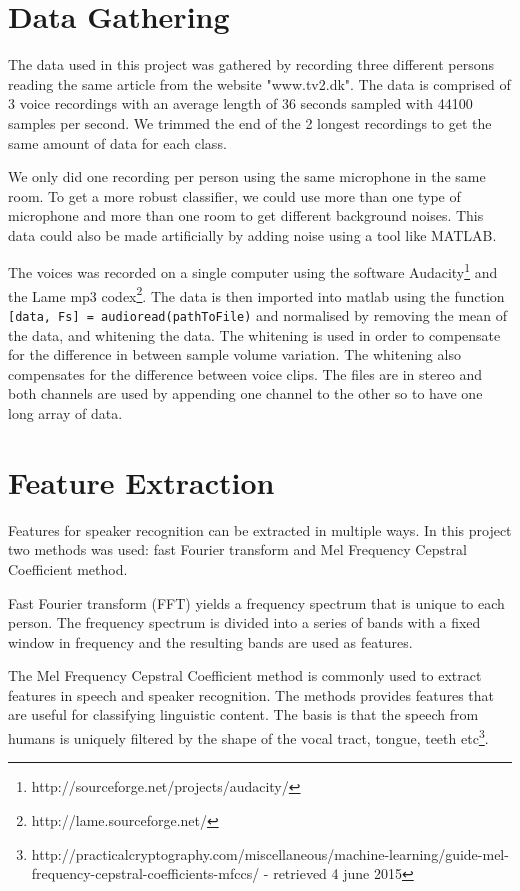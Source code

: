 
\section{Data Gathering}
The data used in this project was gathered by recording three different persons reading the same article from the website "www.tv2.dk".
The data is comprised of 3 voice recordings with an average length of 36 seconds sampled with 44100 samples per second.
We trimmed the end of the 2 longest recordings to get the same amount of data for each class.

We only did one recording per person using the same microphone in the same room.
To get a more robust classifier, we could use more than one type of microphone and more than one room to get different background noises.
This data could also be made artificially by adding noise using a tool like MATLAB.

The voices was recorded on a single computer using the software Audacity\footnote{http://sourceforge.net/projects/audacity/} and the Lame mp3 codex\footnote{http://lame.sourceforge.net/}.
The data is then imported into matlab using the function \texttt{[data, Fs] = audioread(pathToFile)} and normalised by removing the mean of the data, and whitening the data.
The whitening is used in order to compensate for the difference in between sample volume variation. The whitening also compensates for the difference between voice clips.
The files are in stereo and both channels are used by appending one channel to the other so to have one long array of data.

\section{Feature Extraction}
Features for speaker recognition can be extracted in multiple ways. In this project two methods was used: fast Fourier transform and Mel Frequency Cepstral Coefficient method.

Fast Fourier transform (FFT) yields a frequency spectrum that is unique to each person. The frequency spectrum is divided into a series of bands with a fixed window in frequency and the resulting bands are used as features. 

The Mel Frequency Cepstral Coefficient method is commonly used to extract features in speech and speaker recognition. The methods provides features that are useful for classifying linguistic content. The basis is that the speech from humans is uniquely filtered by the shape of the vocal tract, tongue, teeth etc\footnote{http://practicalcryptography.com/miscellaneous/machine-learning/guide-mel-frequency-cepstral-coefficients-mfccs/ - retrieved 4 june 2015}. 

